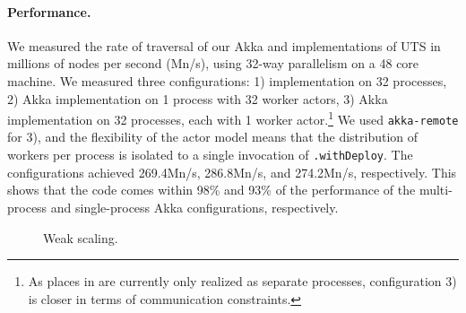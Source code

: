 \paragraph{Performance.} We measured the rate of traversal of our Akka and
\apgas implementations of UTS in millions of nodes per second (Mn/s), using
32-way parallelism on a 48 core machine. We measured three configurations: 1)
\apgas implementation on 32 processes, 2) Akka implementation on 1 process with
32 worker actors, 3) Akka implementation on 32 processes, each with 1 worker
actor.\footnote{As places in \apgas are currently only realized as separate
processes, configuration 3) is closer in terms of communication constraints.}
We used \lstinline{akka-remote} for 3), and the flexibility of the actor model
means that the distribution of workers per process is isolated to a single
invocation of \lstinline{.withDeploy}. The configurations achieved 269.4Mn/s,
286.8Mn/s, and 274.2Mn/s, respectively. This shows that the \apgas code comes
within 98\% and 93\% of the performance of the multi-process and single-process
Akka configurations, respectively.

\begin{figure}

\vspace{-0.3cm}
\hspace{-0.4cm}
\begingroup\graphicspath{{figures/}}\endgroup
\vspace{-0.2cm}
\caption{Weak scaling.}
\label{fig:uts-scaling}
\end{figure}





